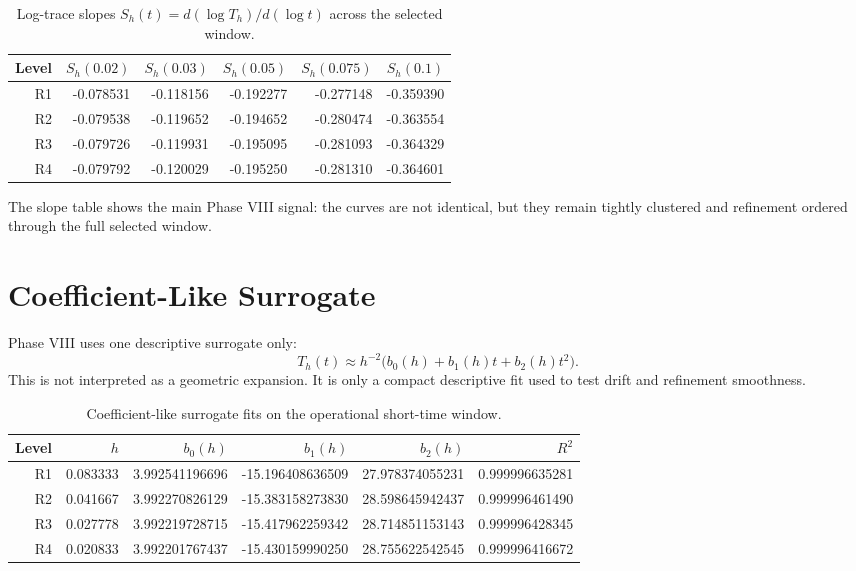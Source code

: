 \documentclass[11pt]{article}
\begin{document}
\begin{table}[t]
\centering
\small
\begin{tabular}{@{}rrrrrr@{}}
\toprule
Level & $S_h(0.02)$ & $S_h(0.03)$ & $S_h(0.05)$ & $S_h(0.075)$ & $S_h(0.1)$ \\
\midrule
R1 & -0.078531 & -0.118156 & -0.192277 & -0.277148 & -0.359390 \\
R2 & -0.079538 & -0.119652 & -0.194652 & -0.280474 & -0.363554 \\
R3 & -0.079726 & -0.119931 & -0.195095 & -0.281093 & -0.364329 \\
R4 & -0.079792 & -0.120029 & -0.195250 & -0.281310 & -0.364601 \\
\bottomrule
\end{tabular}
\caption{Log-trace slopes $S_h(t) = d(\log T_h)/d(\log t)$ across the selected window.}
\label{tab:slopes}
\end{table}

The slope table shows the main Phase VIII signal: the curves are not identical, but they remain tightly clustered and refinement ordered through the full selected window.

\section{Coefficient-Like Surrogate}

Phase VIII uses one descriptive surrogate only:
\[
T_h(t) \approx h^{-2}\bigl(b_0(h) + b_1(h)t + b_2(h)t^2\bigr).
\]
This is not interpreted as a geometric expansion. It is only a compact descriptive fit used to test drift and refinement smoothness.

\begin{table}[t]
\centering
\small
\begin{tabular}{@{}rrrrrr@{}}
\toprule
Level & $h$ & $b_0(h)$ & $b_1(h)$ & $b_2(h)$ & $R^2$ \\
\midrule
R1 & 0.083333 & 3.992541196696 & -15.196408636509 & 27.978374055231 & 0.999996635281 \\
R2 & 0.041667 & 3.992270826129 & -15.383158273830 & 28.598645942437 & 0.999996461490 \\
R3 & 0.027778 & 3.992219728715 & -15.417962259342 & 28.714851153143 & 0.999996428345 \\
R4 & 0.020833 & 3.992201767437 & -15.430159990250 & 28.755622542545 & 0.999996416672 \\
\bottomrule
\end{tabular}
\caption{Coefficient-like surrogate fits on the operational short-time window.}
\label{tab:coefficients}
\end{table}
\end{document}
